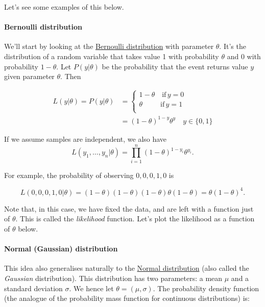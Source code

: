 \documentclass[11pt]{article}
\begin{document}
Let's see some examples of this below.

    \hypertarget{bernoulli-distribution}{%
\paragraph{Bernoulli distribution}\label{bernoulli-distribution}}

We'll start by looking at the
\href{https://en.wikipedia.org/wiki/Bernoulli_distribution}{Bernoulli
distribution} with parameter \(\theta\). It's the distribution of a
random variable that takes value 1 with probability \(\theta\) and 0
with probability \(1-\theta\). Let \(P(y | \theta)\) be the probability
that the event returns value \(y\) given parameter \(\theta\). Then

\[
\begin{align}
L(y | \theta) = P(y | \theta) &= \begin{cases}
1 - \theta \quad \text{if} \, y = 0 \\
\theta \quad \quad \, \, \, \text{if} \, y = 1 \\
\end{cases} \\
&= (1 - \theta)^{1 - y} \theta^y \quad y \in \{0, 1\}
\end{align}
\]

If we assume samples are independent, we also have \[
L(y_1, \ldots, y_n | \theta) = \prod_{i=1}^n (1 - \theta)^{1 - y_i} \theta^{y_i}.
\]

For example, the probability of observing \(0, 0, 0, 1, 0\) is

\[
L(0, 0, 0, 1, 0 | \theta) = (1 - \theta)(1 - \theta)(1 - \theta)\theta(1 - \theta) = \theta(1 - \theta)^4.
\]

Note that, in this case, we have fixed the data, and are left with a
function just of \(\theta\). This is called the \emph{likelihood}
function. Let's plot the likelihood as a function of \(\theta\) below.

    \hypertarget{normal-gaussian-distribution}{%
\paragraph{Normal (Gaussian)
distribution}\label{normal-gaussian-distribution}}

This idea also generalises naturally to the
\href{https://en.wikipedia.org/wiki/Normal_distribution}{Normal
distribution} (also called the \emph{Gaussian} distribution). This
distribution has two parameters: a mean \(\mu\) and a standard deviation
\(\sigma\). We hence let \(\theta = (\mu, \sigma)\). The probability
density function (the analogue of the probability mass function for
continuous distributions) is:
\end{document}

